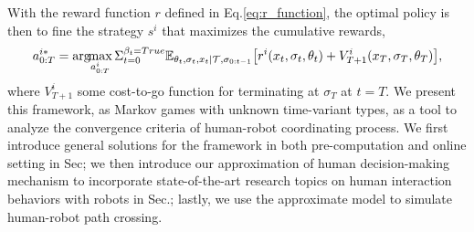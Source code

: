\documentclass[letterpaper, 10 pt, conference]{ieeeconf}  %
\newcommand{\argmax}{\arg\!\!\max}
\begin{document}


With the reward function $r$ defined in Eq.\ref{eq:r_function}, the optimal 
policy is then to fine the strategy $s^i$ that maximizes the cumulative 
rewards,
\begin{equation}\label{eq:optimal}
  a^{i*}_{0:T} = \argmax_{a^i_{0:T}} 
  \Sigma_{t=0}^{\beta_t=True} 
  \mathbb{E}_{\theta_t,\sigma_{t},x_t|\mathcal{T},\sigma_{0:t-1}} \big{[}
  r^i(x_t,\sigma_t,\theta_t)+ V^i_{T+1}(x_T,\sigma_T,\theta_T)\big{]}, 
\end{equation}
where $V^i_{T+1}$ some cost-to-go function for terminating at $\sigma_T$ at 
$t=T$. 
We present this framework, as Markov games with unknown time-variant types,  
as a tool to analyze the convergence criteria of human-robot coordinating 
process. We first 
introduce general solutions for the framework in both pre-computation and 
online setting in Sec; we then introduce our approximation of human 
decision-making mechanism to incorporate state-of-the-art research topics on 
human interaction behaviors with robots in Sec.; lastly, we use the 
approximate model to simulate human-robot path crossing.
\end{document}
